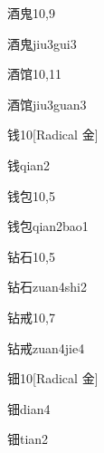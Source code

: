 \begin{entry}{酒鬼}{10,9}
  \begin{phonetics}{酒鬼}{jiu3gui3}
  \end{phonetics}
\end{entry}

\begin{entry}{酒馆}{10,11}
  \begin{phonetics}{酒馆}{jiu3guan3}
  \end{phonetics}
\end{entry}

\begin{entry}{钱}{10}[Radical 金]
  \begin{phonetics}{钱}{qian2}
  \end{phonetics}
\end{entry}

\begin{entry}{钱包}{10,5}
  \begin{phonetics}{钱包}{qian2bao1}
  \end{phonetics}
\end{entry}

\begin{entry}{钻石}{10,5}
  \begin{phonetics}{钻石}{zuan4shi2}
  \end{phonetics}
\end{entry}

\begin{entry}{钻戒}{10,7}
  \begin{phonetics}{钻戒}{zuan4jie4}
  \end{phonetics}
\end{entry}

\begin{entry}{钿}{10}[Radical 金]
  \begin{phonetics}{钿}{dian4}
  \end{phonetics}
  \begin{phonetics}{钿}{tian2}
  \end{phonetics}
\end{entry}

